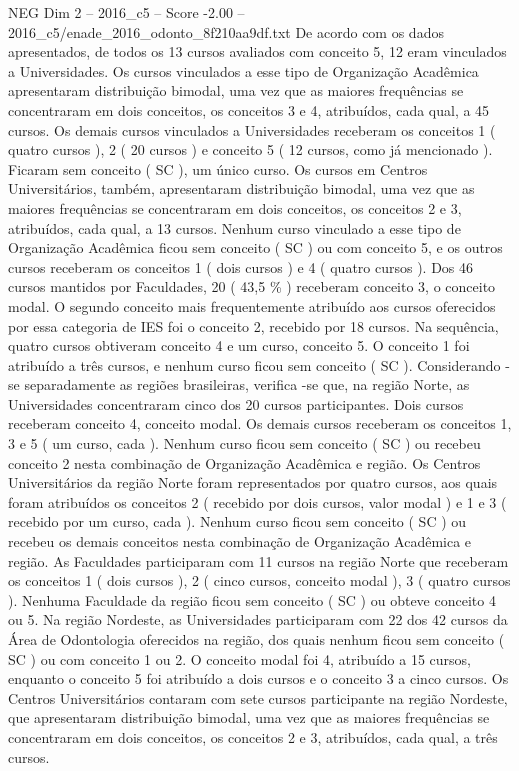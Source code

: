 \begin{textsample}{NEG Dim 2 – 2016\_c5 – Score -2.00 – 2016\_c5/enade\_2016\_odonto\_8f210aa9df.txt}
De acordo com os dados apresentados, de todos os 13 cursos avaliados com conceito 5, 12 eram vinculados a Universidades.
Os cursos vinculados a esse tipo de Organização Acadêmica apresentaram distribuição bimodal, uma vez que as maiores frequências se concentraram em dois conceitos, os conceitos 3 e 4, atribuídos, cada qual, a 45 cursos.
Os demais cursos vinculados a Universidades receberam os conceitos 1 ( quatro cursos ), 2 ( 20 cursos ) e conceito 5 ( 12 cursos, como já mencionado ).
Ficaram sem conceito ( SC ), um único curso.
Os cursos em Centros Universitários, também, apresentaram distribuição bimodal, uma vez que as maiores frequências se concentraram em dois conceitos, os conceitos 2 e 3, atribuídos, cada qual, a 13 cursos.
Nenhum curso vinculado a esse tipo de Organização Acadêmica ficou sem conceito ( SC ) ou com conceito 5, e os outros cursos receberam os conceitos 1 ( dois cursos ) e 4 ( quatro cursos ).
Dos 46 cursos mantidos por Faculdades, 20 ( 43,5 \% ) receberam conceito 3, o conceito modal.
O segundo conceito mais frequentemente atribuído aos cursos oferecidos por essa categoria de IES foi o conceito 2, recebido por 18 cursos.
Na sequência, quatro cursos obtiveram conceito 4 e um curso, conceito 5.
O conceito 1 foi atribuído a três cursos, e nenhum curso ficou sem conceito ( SC ).
Considerando -se separadamente as regiões brasileiras, verifica -se que, na região Norte, as Universidades concentraram cinco dos 20 cursos participantes.
Dois cursos receberam conceito 4, conceito modal.
Os demais cursos receberam os conceitos 1, 3 e 5 ( um curso, cada ).
Nenhum curso ficou sem conceito ( SC ) ou recebeu conceito 2 nesta combinação de Organização Acadêmica e região.
Os Centros Universitários da região Norte foram representados por quatro cursos, aos quais foram atribuídos os conceitos 2 ( recebido por dois cursos, valor modal ) e 1 e 3 ( recebido por um curso, cada ).
Nenhum curso ficou sem conceito ( SC ) ou recebeu os demais conceitos nesta combinação de Organização Acadêmica e região.
As Faculdades participaram com 11 cursos na região Norte que receberam os conceitos 1 ( dois cursos ), 2 ( cinco cursos, conceito modal ), 3 ( quatro cursos ).
Nenhuma Faculdade da região ficou sem conceito ( SC ) ou obteve conceito 4 ou 5.
Na região Nordeste, as Universidades participaram com 22 dos 42 cursos da Área de Odontologia oferecidos na região, dos quais nenhum ficou sem conceito ( SC ) ou com conceito 1 ou 2.
O conceito modal foi 4, atribuído a 15 cursos, enquanto o conceito 5 foi atribuído a dois cursos e o conceito 3 a cinco cursos.
Os Centros Universitários contaram com sete cursos participante na região Nordeste, que apresentaram distribuição bimodal, uma vez que as maiores frequências se concentraram em dois conceitos, os conceitos 2 e 3, atribuídos, cada qual, a três cursos.

\end{textsample}
